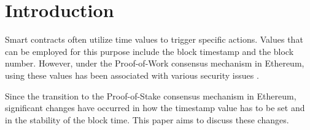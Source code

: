 \section{Introduction}

Smart contracts often utilize time values to trigger specific actions. Values
that can be employed for this purpose include the block timestamp and
the block number. However, under the Proof-of-Work consensus mechanism in
Ethereum, using these values has been associated with various security issues
\cite{swc116} \cite{Conkas2021} \cite{DASP2018} \cite{Osiris2018}
\cite{Oyente2016}.

Since the transition to the Proof-of-Stake consensus mechanism in
Ethereum, significant changes have occurred in how the timestamp value has to
be set and in the stability of the block time. This paper aims to discuss these
changes. 


